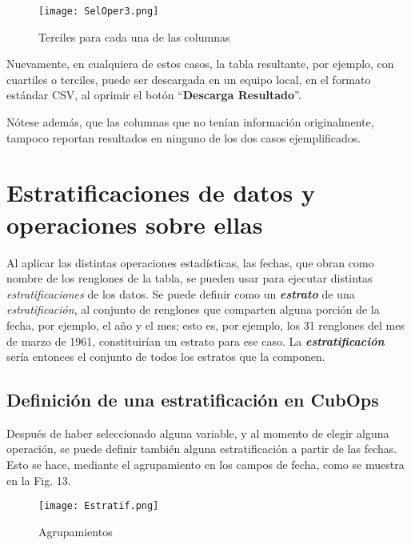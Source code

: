 \documentclass[spanish,]{article}
\begin{document}
\begin{figure}
\centering
\texttt{[image: SelOper3.png]}
\caption{Terciles para cada una de las columnas}
\end{figure}

Nuevamente, en cualquiera de estos casos, la tabla resultante, por
ejemplo, con cuartiles o terciles, puede ser descargada en un equipo
local, en el formato estándar CSV, al oprimir el botón
``\textbf{Descarga Resultado}''.

Nótese además, que las columnas que no tenían información originalmente,
tampoco reportan resultados en ninguno de los dos casos ejemplificados.

\section{Estratificaciones de datos y operaciones sobre
ellas}\label{estratificaciones-de-datos-y-operaciones-sobre-ellas}

Al aplicar las distintas operaciones estadísticas, las fechas, que obran
como nombre de los renglones de la tabla, se pueden usar para ejecutar
distintas \emph{estratificaciones} de los datos. Se puede definir como
un \emph{\textbf{estrato}} de una \emph{estratificación}, al conjunto de
renglones que comparten alguna porción de la fecha, por ejemplo, el año
y el mes; esto es, por ejemplo, los 31 renglones del mes de marzo de
1961, constituirían un estrato para ese caso. La
\emph{\textbf{estratificación}} sería entonces el conjunto de todos los
estratos que la componen.

\subsection{Definición de una estratificación en
CubOps}\label{definicion-de-una-estratificacion-en-cubops}

Después de haber seleccionado alguna variable, y al momento de elegir
alguna operación, se puede definir también alguna estratificación a
partir de las fechas. Esto se hace, mediante el agrupamiento en los
campos de fecha, como se muestra en la Fig. 13.

\begin{figure}
\centering
\texttt{[image: Estratif.png]}
\caption{Agrupamientos}
\end{figure}
\end{document}
